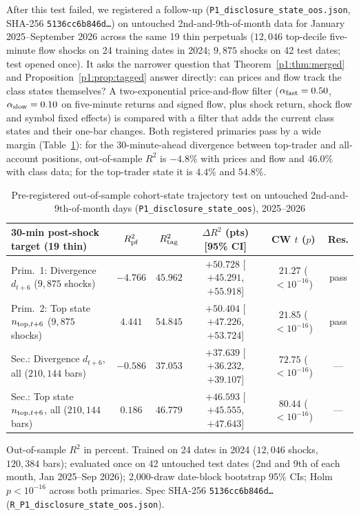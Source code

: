 After this test failed, we registered a follow-up (\texttt{P1\_disclosure\_state\_oos.json}, SHA-256 \texttt{5136cc6b846d\ldots}) on untouched 2nd-and-9th-of-month data for January 2025--September 2026 across the same 19 thin perpetuals ($12{,}046$ top-decile five-minute flow shocks on 24 training dates in 2024; $9{,}875$ shocks on 42 test dates; test opened once). It asks the narrower question that Theorem~\ref{p1:thm:merged} and Proposition~\ref{p1:prop:tagged} answer directly: can prices and flow track the class states themselves? A two-exponential price-and-flow filter ($\alpha_{\rm fast}=0.50$, $\alpha_{\rm slow}=0.10$ on five-minute returns and signed flow, plus shock return, shock flow and symbol fixed effects) is compared with a filter that adds the current class states and their one-bar changes. Both registered primaries pass by a wide margin (Table~\ref{p1:tab:disc_state_oos}): for the 30-minute-ahead divergence between top-trader and all-account positions, out-of-sample $R^2$ is $-4.8\%$ with prices and flow and $46.0\%$ with class data; for the top-trader state it is $4.4\%$ and $54.8\%$.

\begin{table}[!htbp]\centering\footnotesize
\begin{threeparttable}
\caption{Pre-registered out-of-sample cohort-state trajectory test on untouched 2nd-and-9th-of-month days (\texttt{P1\_disclosure\_state\_oos}), 2025--2026}\label{p1:tab:disc_state_oos}
\setlength{\tabcolsep}{1.4pt}
\begin{tabular}{lccccc}
\toprule
30-min post-shock target (19 thin) & $R^2_{\rm pf}$ & $R^2_{\rm tag}$ & $\Delta R^2$ (pts) [95\% CI] & CW $t$ ($p$) & Res.\\
\midrule
Prim.\ 1: Divergence $d_{t+6}$ ($9{,}875$ shocks) & $-4.766$ & $45.962$ & $+50.728$ [$+45.291$, $+55.918$] & $21.27$ ($<10^{-16}$) & pass\\
Prim.\ 2: Top state $n_{{\rm top},t+6}$ ($9{,}875$ shocks) & $4.441$ & $54.845$ & $+50.404$ [$+47.226$, $+53.724$] & $21.85$ ($<10^{-16}$) & pass\\
Sec.: Divergence $d_{t+6}$, all ($210{,}144$ bars) & $-0.586$ & $37.053$ & $+37.639$ [$+36.232$, $+39.107$] & $72.75$ ($<10^{-16}$) & ---\\
Sec.: Top state $n_{{\rm top},t+6}$, all ($210{,}144$ bars) & $0.186$ & $46.779$ & $+46.593$ [$+45.555$, $+47.643$] & $80.44$ ($<10^{-16}$) & ---\\
\bottomrule
\end{tabular}
\begin{tablenotes}\footnotesize\item Out-of-sample $R^2$ in percent. Trained on 24 dates in 2024 ($12{,}046$ shocks, $120{,}384$ bars); evaluated once on 42 untouched test dates (2nd and 9th of each month, Jan 2025--Sep 2026); 2{,}000-draw date-block bootstrap 95\% CIs; Holm $p<10^{-16}$ across both primaries. Spec SHA-256 \texttt{5136cc6b846d\ldots} (\texttt{R\_P1\_disclosure\_state\_oos.json}).\end{tablenotes}
\end{threeparttable}
\end{table}

